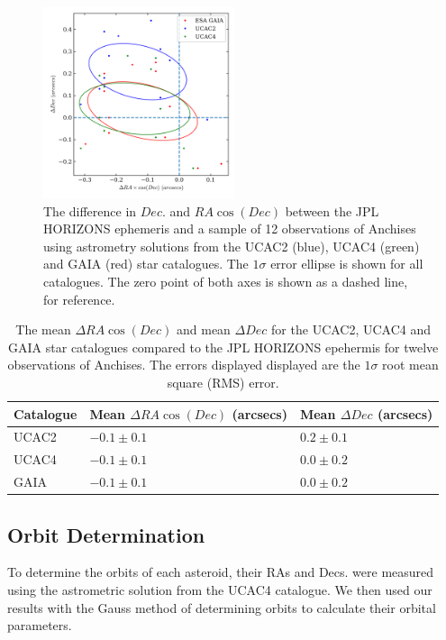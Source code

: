 \documentclass[10pt, twocolumn]{revtex4}    %
\begin{document}
\begin{figure}[h!]
\centering
\includegraphics[width=0.5\textwidth]{20180424_174110_ASTROM_COMPARE}
\caption{The difference in $Dec.$ and $RA\cos(Dec)$ between the JPL HORIZONS ephemeris and a sample of 12 observations of Anchises using astrometry solutions from the UCAC2 (blue), UCAC4 (green) and GAIA (red) star catalogues. The $1\sigma$ error ellipse is shown for all catalogues. The zero point of both axes is shown as a dashed line, for reference.}
\label{fig: astrom compare}
\end{figure}

\begin{table}[h!]
\centering
\begin{tabularx}{0.5\textwidth}{ Y Y Y }
\hhline{===}
Catalogue & Mean $\Delta RA \cos (Dec)$ (arcsecs) & Mean $\Delta Dec$ (arcsecs) \\[3pt] \hline
UCAC2 & $-0.1 \pm 0.1$ & $0.2 \pm 0.1$ \\[3pt]
UCAC4 & $-0.1 \pm 0.1$ & $0.0 \pm 0.2$ \\[3pt]
GAIA & $-0.1 \pm 0.1$ & $0.0 \pm 0.2$ \\[3pt] \hline
\end{tabularx}
\caption{The mean $\Delta RA \cos (Dec)$ and mean $\Delta Dec$ for the UCAC2, UCAC4 and GAIA star catalogues compared to the JPL HORIZONS epehermis for twelve observations of Anchises. The errors displayed displayed are the $1\sigma$ root mean square (RMS) error.}
\label{tab: astrom compare results}
\end{table}


\subsection*{Orbit Determination}

To determine the orbits of each asteroid, their RAs and Decs. were measured using the astrometric solution from the UCAC4 catalogue. We then used our results with the Gauss method of determining orbits to calculate their orbital parameters.
\end{document}
